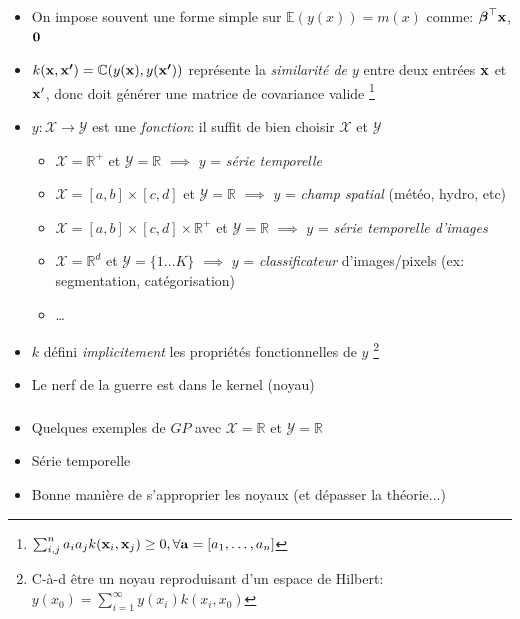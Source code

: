 \documentclass[xcolor=svgnames, t]{beamer}
\newcommand{\coloredemph}[1]{\textcolor{internationalblue}{\emph{#1}}}
\newcommand{\vectorx}[1]{\boldsymbol{\MakeLowercase{\mathbf{#1}}}}
\begin{document}
\begin{frame}
  \frametitle{\secname}
  \begin{itemize}
    \item On impose souvent une forme simple sur $\mathbb{E}(y(x)) = m(x)$ 
    comme: $\vectorx{\beta}^\top \vectorx{x}$, $\vectorx{0}$
    \pause
    \item $k(\vectorx{x}, \vectorx{x^{\prime}}) = \mathbb{C}( y(\vectorx{x}), y(\vectorx{x^\prime}) )$
     représente la \coloredemph{similarité de $y$} entre deux entrées $\vectorx{x}$ et $\vectorx{x}^\prime$,
     donc doit générer une matrice de covariance valide
     \footnote{
      $\sum_{i,j}^{n} a_i a_j k(\vectorx{x}_i, \vectorx{x}_j) \geq 0, \forall \vectorx{a} = [a_1, \dots, a_n]$
    }
    \pause
    \item $y: \mathcal{X} \to \mathcal{Y}$ est une \coloredemph{fonction}: il suffit de bien choisir $\mathcal{X}$ et $\mathcal{Y}$
    \begin{itemize}
      \item $\mathcal{X} = \mathbb{R}^{+}$ et $\mathcal{Y} = \mathbb{R}$ $\implies$
      $y$ = \coloredemph{série temporelle}
      \pause
      \item $\mathcal{X} = [a, b] \times [c, d]$ et  $\mathcal{Y} = \mathbb{R}$ $\implies$
      $y$ = \coloredemph{champ spatial} (météo, hydro, etc)
      \pause
      \item $\mathcal{X} = [a, b] \times [c, d] \times \mathbb{R}^{+}$ et $\mathcal{Y} = \mathbb{R}$ $\implies$
      $y$ = \coloredemph{série temporelle d'images}
      \pause
      \item $\mathcal{X} = \mathbb{R}^{d}$ et $\mathcal{Y} = \{1 \dots K \}$ $\implies$
      $y$ = \coloredemph{classificateur} d'images/pixels (ex: segmentation, catégorisation)
      \item \dots 
    \end{itemize}
    \pause
    \item $k$ défini \coloredemph{implicitement} les propriétés fonctionnelles de $y$
    \footnote{
      C-à-d être un noyau reproduisant d'un espace de Hilbert:
      $y(x_0) = \sum_{i=1}^{\infty} y(x_i) k(x_i, x_0)$ 
    }
    \pause
    \item Le nerf de la guerre est dans le kernel (noyau)
  \end{itemize}
\end{frame}

\begin{frame}
  \frametitle{\secname}
  \begin{itemize}
    \item Quelques exemples de $GP$ avec $\mathcal{X} = \mathbb{R}$ et $\mathcal{Y} = \mathbb{R}$
    \item Série temporelle
    \item Bonne manière de s'approprier les noyaux (et dépasser la théorie...)
  \end{itemize}
  
\end{frame}
\end{document}
